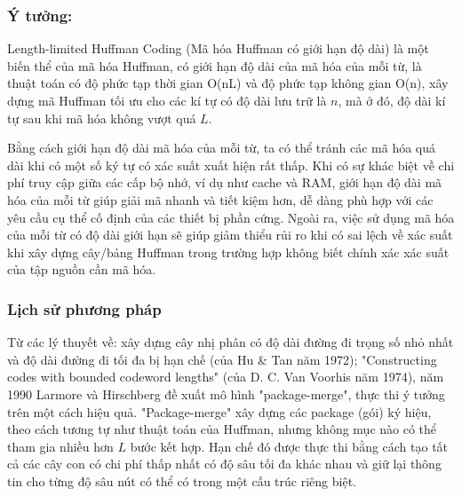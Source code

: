\subsubsection{Ý tưởng:}

Length-limited Huffman Coding (Mã hóa Huffman có giới hạn độ dài) là một biến thể của mã hóa Huffman, có giới hạn độ dài của mã hóa của mỗi từ, là thuật toán có độ phức tạp thời gian O(nL) và độ phức tạp không gian O(n), xây dựng mã Huffman tối ưu cho các kí tự có độ dài lưu trữ là $n$, mà ở đó, độ dài kí tự sau khi mã hóa không vượt quá $L$.

Bằng cách giới hạn độ dài mã hóa của mỗi từ, ta có thể tránh các mã hóa quá dài khi có một số ký tự có xác suất xuất hiện rất thấp. Khi có sự khác biệt về chi phí truy cập giữa các cấp bộ nhớ, ví dụ như cache và RAM, giới hạn độ dài mã hóa của mỗi từ giúp giải mã nhanh và tiết kiệm hơn, dễ dàng phù hợp với các yêu cầu cụ thể cố định của các thiết bị phần cứng. Ngoài ra, việc sử dụng mã hóa của mỗi từ có độ dài giới hạn sẽ giúp giảm thiểu rủi ro khi có sai lệch về xác suất khi xây dựng cây/bảng Huffman trong trường hợp không biết chính xác xác suất của tập nguồn cần mã hóa.

\subsubsection{Lịch sử phương pháp}

Từ các lý thuyết về: xây dựng cây nhị phân có độ dài đường đi trọng số nhỏ nhất và độ dài đường đi tối đa bị hạn chế (của Hu \& Tan năm 1972); "Constructing codes with bounded codeword lengths" (của D. C. Van Voorhis năm 1974), năm 1990 Larmore và Hirschberg đề xuất mô hình "package-merge", thực thi ý tưởng trên một cách hiệu quả. "Package-merge" xây dựng các package (gói) ký hiệu, theo cách tương tự như thuật toán của Huffman, nhưng không mục nào có thể tham gia nhiều hơn $L$ bước kết hợp. Hạn chế đó được thực thi bằng cách tạo tất cả các cây con có chi phí thấp nhất có độ sâu tối đa khác nhau và giữ lại thông tin cho từng độ sâu nút có thể có trong một cấu trúc riêng biệt.

